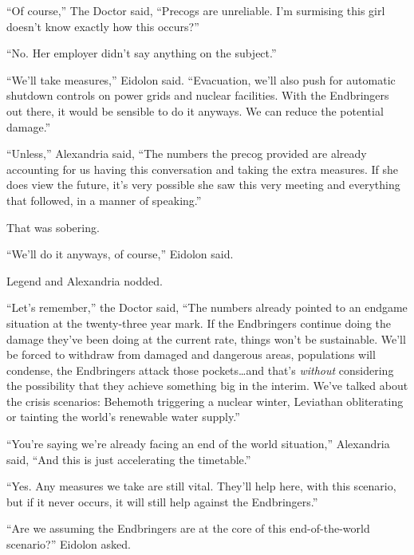 ``Of course,'' The Doctor said, ``Precogs are unreliable.  I'm surmising this girl doesn't know exactly how this occurs?''



``No.  Her employer didn't say anything on the subject.''



``We'll take measures,'' Eidolon said.  ``Evacuation, we'll also push for automatic shutdown controls on power grids and nuclear facilities.  With the Endbringers out there, it would be sensible to do it anyways.  We can reduce the potential damage.''



``Unless,'' Alexandria said, ``The numbers the precog provided are already accounting for us having this conversation and taking the extra measures.  If she does view the future, it's very possible she saw this very meeting and everything that followed, in a manner of speaking.''



That was sobering.



``We'll do it anyways, of course,'' Eidolon said.



Legend and Alexandria nodded.



``Let's remember,'' the Doctor said, ``The numbers already pointed to an endgame situation at the twenty-three year mark.  If the Endbringers continue doing the damage they've been doing at the current rate, things won't be sustainable.  We'll be forced to withdraw from damaged and dangerous areas, populations will condense, the Endbringers attack those pockets\ldots  and that's \emph{without} considering the possibility that they achieve something big in the interim.  We've talked about the crisis scenarios: Behemoth triggering a nuclear winter, Leviathan obliterating or tainting the world's renewable water supply.''



``You're saying we're already facing an end of the world situation,'' Alexandria said, ``And this is just accelerating the timetable.''



``Yes.  Any measures we take are still vital.  They'll help here, with this scenario, but if it never occurs, it will still help against the Endbringers.''



``Are we assuming the Endbringers are at the core of this end-of-the-world scenario?'' Eidolon asked.



